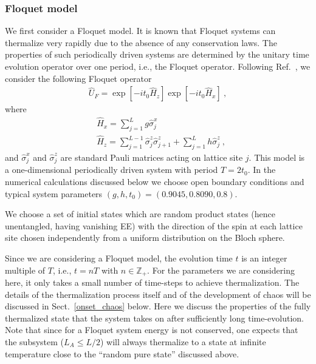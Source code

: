 \documentclass[aps,prb,preprint,onecolumn,amsmath,amssymb,superscriptaddress,eqsecnum,floatfix,scrartcl]{revtex4-1}
\begin{document}
\subsubsection{Floquet model}
\label{SubSectionFloquetModel}
We first consider a Floquet model.
It is known
that Floquet systems can thermalize very 
rapidly  due to the absence of any  conservation laws.\cite{Kim_Huse_2014, DAlessio2014,Lazarides2014,PONTE2015,Zhang2015}
The properties of 
such periodically driven systems  are determined by the unitary time evolution operator over one period, i.e., the Floquet operator. Following Ref.\ , 
we consider the following Floquet operator
\begin{align}
\hat{U}_F=\exp[-i t_0 \hat{H}_z]\exp\left[-it_0\hat H_x\right] ~,
\label{flo_op}
\end{align}
where
\begin{align}
&\hat{H}_x=\sum_{j=1}^{L}g\hat\sigma_j^x\nonumber\\
&\hat{H}_z=\sum_{j=1}^{L-1}\hat\sigma_j^z\hat\sigma_{j+1}^z+\sum_{j=1}^Lh\hat\sigma_j^z ~,
\label{floq}
\end{align}
and ${\hat \sigma}^x_j$ and ${\hat \sigma}^z_j$ are standard Pauli matrices acting on lattice site $j$.
This model is a one-dimensional periodically driven system with period $T=2t_0$. In the numerical calculations
discussed below
we choose open boundary conditions and typical system parameters
 $(g,h,t_0)=(0.9045, 0.8090, 0.8)$.




We choose a set of 
initial states which are
random product states (hence unentangled,  having vanishing EE)
with  the direction of the spin 
at each  lattice site chosen independently from a uniform distribution on the Bloch sphere.

 Since we are considering a Floquet model, the evolution time $t$ is 
an integer multiple of $T$, i.e., $t=nT$ with $n\in\mathbb{Z}_+$. For the parameters we are considering here, it only takes a  small number of
time-steps to
achieve  thermalization. The details  of the  thermalization process itself and of  the 
development of chaos
 will be discussed in Sect.~\ref{onset_chaos} below. 
Here we discuss the properties of the fully thermalized state that the system takes on after  sufficiently long time-evolution.
Note that since
for a Floquet system energy is not conserved, 
one expects that the subsystem ($L_A\leq L/2$) will always thermalize 
to a  state  at  infinite temperature close to the  ``random pure state'' discussed above.\cite{Zhang2015} 
\end{document}
